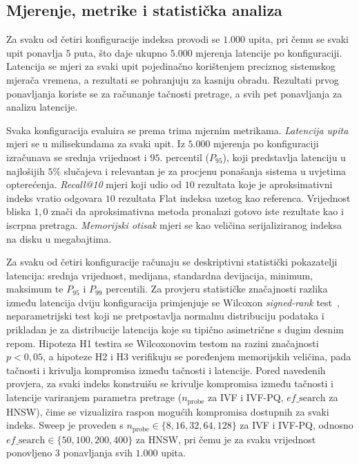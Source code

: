 \subsection{Mjerenje, metrike i statistička analiza}
\label{sec:mjerenje_statistika}

Za svaku od četiri konfiguracije indeksa provodi se $1{.}000$ upita,
pri čemu se svaki upit ponavlja $5$ puta, što daje ukupno $5{.}000$
mjerenja latencije po konfiguraciji. Latencija se mjeri za svaki upit
pojedinačno korištenjem preciznog sistemskog mjerača vremena, a rezultati
se pohranjuju za kasniju obradu. Rezultati prvog ponavljanja koriste se
za računanje tačnosti pretrage, a svih pet ponavljanja za analizu latencije.

Svaka konfiguracija evaluira se prema trima mjernim metrikama.
\emph{Latencija upita} mjeri se u milisekundama za svaki upit. Iz $5{.}000$
mjerenja po konfiguraciji izračunava se srednja vrijednost i $95.$ percentil
($P_{95}$), koji predstavlja latenciju u najlošijih $5\%$ slučajeva i
relevantan je za procjenu ponašanja sistema u uvjetima opterećenja.
\emph{\foreignlanguage{english}{Recall@10}} mjeri koji udio od $10$ rezultata
koje je aproksimativni indeks vratio odgovara $10$ rezultata
\foreignlanguage{english}{Flat} indeksa uzetog kao referenca. Vrijednost
bliska $1{,}0$ znači da aproksimativna metoda pronalazi gotovo iste rezultate
kao i iscrpna pretraga. \emph{Memorijski otisak} mjeri se kao veličina
serijaliziranog indeksa na disku u megabajtima.

Za svaku od četiri konfiguracije računaju se deskriptivni statistički
pokazatelji latencija: srednja vrijednost, medijana, standardna devijacija,
minimum, maksimum te $P_{95}$ i $P_{99}$ percentili. Za provjeru statističke
značajnosti razlika između latencija dviju konfiguracija primjenjuje se
Wilcoxon \foreignlanguage{english}{\emph{signed-rank}} test~\cite{demsar2006},
neparametrijski test koji ne pretpostavlja normalnu distribuciju podataka
i prikladan je za distribucije latencija koje su tipično asimetrične s dugim
desnim repom. Hipoteza H1 testira se Wilcoxonovim testom na
razini značajnosti $p < 0{,}05$, a hipoteze H2 i H3 verifikuju
se poređenjem memorijskih veličina, pada tačnosti i krivulja
kompromisa između tačnosti i latencije. Pored navedenih
provjera, za svaki indeks konstruišu se
krivulje kompromisa između tačnosti i latencije variranjem parametra pretrage
($n_{\mathrm{probe}}$ za \foreignlanguage{english}{IVF} i
\foreignlanguage{english}{IVF-PQ}, $ef\_\mathrm{search}$ za
\foreignlanguage{english}{HNSW}), čime se vizualizira raspon mogućih
kompromisa dostupnih za svaki indeks. Sweep je proveden s
$n_{\mathrm{probe}} \in \{8, 16, 32, 64, 128\}$ za
\foreignlanguage{english}{IVF} i \foreignlanguage{english}{IVF-PQ},
odnosno $ef\_\mathrm{search} \in \{50, 100, 200, 400\}$ za
\foreignlanguage{english}{HNSW}, pri čemu je za svaku vrijednost
ponovljeno $3$ ponavljanja svih $1{.}000$ upita.
